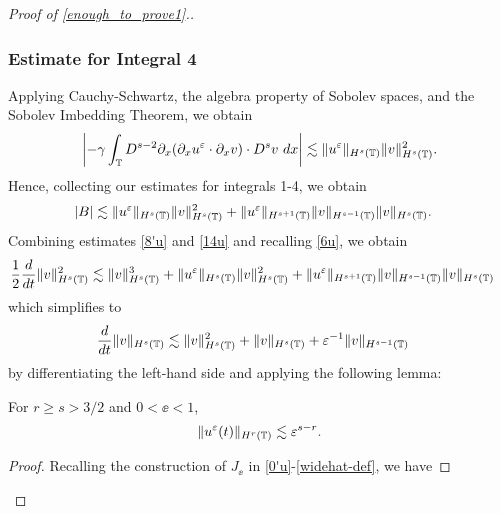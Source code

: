 \begin{proof}[Proof of \eqref{enough_to_prove1}.]
\subsubsection{Estimate for Integral 4} Applying Cauchy-Schwartz, the 
algebra property of Sobolev spaces, and the Sobolev Imbedding Theorem, we 
obtain
%
%
\begin{equation*}
\begin{split}
\left |-\gamma \int_{\mathbb{T}} D^{s-2} \partial_x
(\partial_x u^\varepsilon \cdot \partial_x v) \cdot D^s v \
dx \right |
 \lesssim \|u^\varepsilon\|_{H^s(\mathbb{T})} \|v\|_{H^s(\mathbb{T})}^2.
\end{split}
\end{equation*}
%
%
Hence, collecting our estimates for integrals 1-4, we obtain 
%
%
\begin{equation}
\begin{split}
|B| & \lesssim
\|u^\varepsilon\|_{H^s(\mathbb{T})}
\|v\|_{H^s(\mathbb{T})}^2 + \|u^\varepsilon\|_{H^{s+1}(\mathbb{T})}
\|v\|_{H^{s-1}(\mathbb{T})} \|v\|_{H^s(\mathbb{T})}.
\label{14u}
\end{split}
\end{equation}
%
%
Combining estimates \eqref{8'u} and \eqref{14u} and recalling
\eqref{6u}, we obtain
%
%
\begin{equation*}
\begin{split}
\frac{1}{2}\frac{d}{dt}\|v\|_{H^{s}(\mathbb{T})}^2
& \lesssim \|v\|_{H^s(\mathbb{T})}^3 + \|u^\varepsilon\|_{H^s(\mathbb{T})}
\|v\|_{H^s(\mathbb{T})}^2
 + \|u^\varepsilon\|_{H^{s+1}(\mathbb{T})}
\|v\|_{H^{s-1}(\mathbb{T})} \|v\|_{H^s(\mathbb{T})}
\end{split}
\end{equation*}
%
%
which simplifies to 
\begin{equation}
\begin{split}
\frac{d}{dt}\|v\|_{H^{s}(\mathbb{T})}
& \lesssim \|v\|_{H^s(\mathbb{T})}^2 + 
\|v\|_{H^s(\mathbb{T})}
+ \varepsilon^{-1}
\|v\|_{H^{s-1}(\mathbb{T})} 
\label{15u}
\end{split}
\end{equation}
by differentiating the left-hand side and applying the following lemma:
%
%
%
\begin{lemma}
\label{lem5r}
For $r \ge s > 3/2$ and $0 < \ee <1$, 
%
%
\begin{equation}
\begin{split}
\|u^{\varepsilon} (t) \|_{H^r(\mathbb{T})} \lesssim \varepsilon^{s-r}.
\label{700r}
\end{split}
\end{equation}
%
%
\end{lemma}
%
%
\begin{proof} Recalling the construction of $J_\ee$ in 
\eqref{0'u}-\eqref{widehat-def},  we have

\end{proof}
\end{proof}
